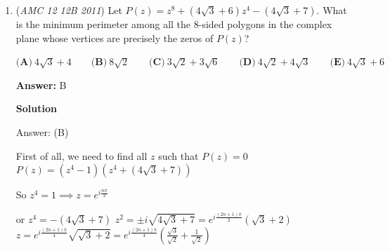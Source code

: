 \begin{enumerate}
 tl;dr the interior of the octagon in blue is a result of taking all the points that can be reached from the boundary of the box as described in no more than 5 moves. We can then proceed to find the area in any simple way. (Extra way & diagram by Technodoggo)

 


 



\textbf{Solution 3 (think about it a lil bit)}

We start with reaching $B$ from $A$ first. It only takes $10$ moves, a sequence of moves down and towards the right. This is a $5$ by $7$ grid of squares. For the remaining $10$ moves, we can move $5$ moves out, and then spend the other $5$ moves "undoing" these $5$ moves. For example, we can move $4$ left and $1$ up at the start, and of the remaining $15$ moves, there must be $4$ "downs" and $6$ "rights", along with $5$ moves that undo the original $5$ at the start.

 
Drawing it on a grid, we will have one center rectangle, 4 rectangles attached to it (1 on each side), and 1 triangle in each corner. The total number of points is $35+35+35+25+25+10+10+10+10 = \boxed{\textbf{(C) }195}$.

 -skibbysiggy

 


	\item (\textit{AMC 12 12B 2011}) Let $P(z) = z^8 + \left(4\sqrt{3} + 6\right)z^4 - \left(4\sqrt{3} + 7\right)$. What is the minimum perimeter among all the $8$-sided polygons in the complex plane whose vertices are precisely the zeros of $P(z)$?


 $\textbf{(A)}\ 4\sqrt{3} + 4 \qquad \textbf{(B)}\ 8\sqrt{2} \qquad \textbf{(C)}\  3\sqrt{2} + 3\sqrt{6} \qquad \textbf{(D)}\  4\sqrt{2} + 4\sqrt{3} \qquad \textbf{(E)}\  4\sqrt{3} + 6$

 \textbf{Answer: }B



\textbf{Solution}

Answer: (B)

 First of all, we need to find all $z$  such that $P(z) = 0$
$P(z) = \left(z^4 - 1\right)\left(z^4 + \left(4\sqrt{3} + 7\right)\right)$

 So $z^4 = 1 \implies z =  e^{i\frac{n\pi}{2}}$

 or $z^4 = - \left(4\sqrt{3} + 7\right)$
$z^2 = \pm i \sqrt{4\sqrt{3} + 7} = e^{i\frac{(2n+1)\pi}{2}} \left(\sqrt{3} + 2\right)$
$z = e^{i\frac{(2n+1)\pi}{4}} \sqrt{\sqrt{3} + 2} = e^{i\frac{(2n+1)\pi}{4}} \left(\frac{\sqrt{3}}{\sqrt{2}} + \frac{1}{\sqrt{2}}\right)$


\end{enumerate}
